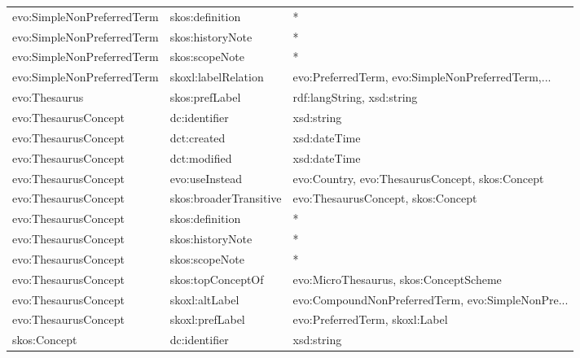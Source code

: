 \documentclass[10pt,a4paper,titlepage,final]{article}
\begin{document}
\begin{tabularx}{\textwidth}{llX}
   evo:SimpleNonPreferredTerm &               skos:definition &                                                  * \\
   evo:SimpleNonPreferredTerm &              skos:historyNote &                                                  * \\
   evo:SimpleNonPreferredTerm &                skos:scopeNote &                                                  * \\
   evo:SimpleNonPreferredTerm &           skoxl:labelRelation &  evo:PreferredTerm, evo:SimpleNonPreferredTerm,... \\
                evo:Thesaurus &                skos:prefLabel &                         rdf:langString, xsd:string \\
         evo:ThesaurusConcept &                 dc:identifier &                                         xsd:string \\
         evo:ThesaurusConcept &                   dct:created &                                       xsd:dateTime \\
         evo:ThesaurusConcept &                  dct:modified &                                       xsd:dateTime \\
         evo:ThesaurusConcept &                evo:useInstead &    evo:Country, evo:ThesaurusConcept, skos:Concept \\
         evo:ThesaurusConcept &        skos:broaderTransitive &                 evo:ThesaurusConcept, skos:Concept \\
         evo:ThesaurusConcept &               skos:definition &                                                  * \\
         evo:ThesaurusConcept &              skos:historyNote &                                                  * \\
         evo:ThesaurusConcept &                skos:scopeNote &                                                  * \\
         evo:ThesaurusConcept &             skos:topConceptOf &             evo:MicroThesaurus, skos:ConceptScheme \\
         evo:ThesaurusConcept &                skoxl:altLabel &  evo:CompoundNonPreferredTerm, evo:SimpleNonPre... \\
         evo:ThesaurusConcept &               skoxl:prefLabel &                     evo:PreferredTerm, skoxl:Label \\
                 skos:Concept &                 dc:identifier &                                         xsd:string \\

\end{tabularx}
\end{document}
